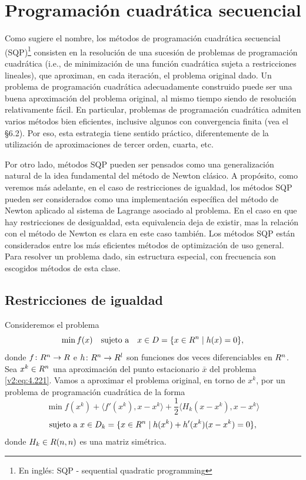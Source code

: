 
\section{Programación cuadrática secuencial}\label{v2:sec:4.6}

Como sugiere el nombre, los métodos de programación cuadrática secuencial (SQP)\footnote{En inglés: SQP - sequential quadratic programming} consisten en la resolución de una sucesión de problemas de programación cuadrática (i.e., de minimización de una función cuadrática sujeta a restricciones lineales), que aproximan, en cada iteración, el problema original dado. Un problema de programación cuadrática adecuadamente construido puede ser una buena aproximación del problema original, al mismo tiempo siendo de resolución relativamente fácil. En particular, problemas de programación cuadrática admiten varios métodos bien eficientes, inclusive algunos con convergencia finita (vea el \S 6.2). Por eso, esta estrategia tiene sentido práctico, diferentemente de la utilización de aproximaciones de tercer orden, cuarta, etc.

Por otro lado, métodos SQP pueden ser pensados como una generalización natural de la idea fundamental del método de Newton clásico. A propósito, como veremos más adelante, en el caso de restricciones de igualdad, los métodos SQP pueden ser considerados como una implementación específica del método de Newton aplicado al sistema de Lagrange asociado al problema. En el caso en que hay restricciones de desigualdad, esta equivalencia deja de existir, mas la relación con el método de Newton es clara en este caso también.
Los métodos SQP están considerados entre los más eficientes métodos de optimización de uso general. Para resolver un problema dado, sin estructura especial, con frecuencia son escogidos métodos de esta clase.

\subsection{Restricciones de igualdad}\label{v2:sec:4.6.1}

Consideremos el problema
\begin{equation}
    \min f(x) \quad \text{sujeto a} \quad x \in D = \{x \in R^n \mid h(x) = 0\},
    \label{v2:eq:4.221}
\end{equation}
donde $f \colon R^n \to R$ e $h \colon R^n \to R^l$ son funciones dos veces diferenciables en $R^n$.
Sea $x^k \in R^n$ una aproximación del punto estacionario $\bar{x}$ del problema \eqref{v2:eq:4.221}. Vamos a aproximar el problema original, en torno de $x^k$, por un problema de programación cuadrática de la forma
\begin{equation}
    \min f(x^k) + \langle f'(x^k), x - x^k \rangle + \frac{1}{2}\langle H_k(x - x^k), x - x^k \rangle
    \label{v2:eq:4.222}
\end{equation}
\[
    \text{sujeto a } x \in D_k = \{x \in R^n \mid h(x^k) + h'(x^k)(x - x^k) = 0\},
\]
donde $H_k \in R(n, n)$ es una matriz simétrica.

